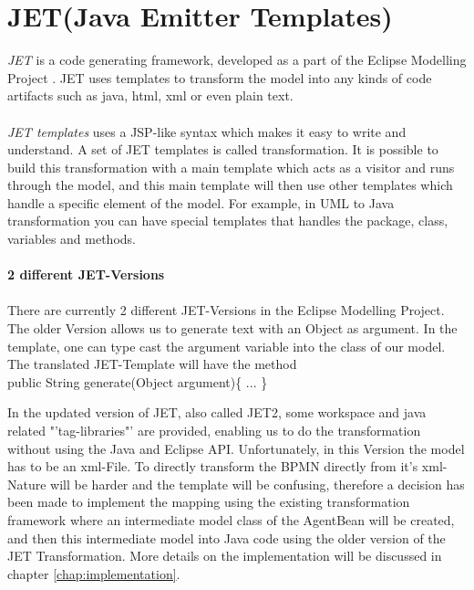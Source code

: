 \section{JET(Java Emitter Templates)}
\textit{JET}\cite{13} is a code generating framework, developed as a part of the Eclipse Modelling Project \cite{14}. JET uses templates to transform the model into any kinds of code artifacts such as java, html, xml or even plain text. \\\\
\textit{JET templates} uses a JSP-like syntax which makes it easy to write and understand. A set of JET templates is called transformation. It is possible to build this transformation with a main template which acts as a visitor and runs through the model, and this main template will then use other templates which handle a specific element of the model. For example, in UML to Java transformation you can have special templates that handles the package, class, variables and methods.\\\\

\textbf{2 different JET-Versions}\\\\
There are currently 2 different JET-Versions in the Eclipse Modelling Project. The older Version allows us to generate text with an Object as argument. In the template, one can type cast the argument variable into the class of our model. \\
The translated JET-Template will have the method \\
public String generate(Object argument)\{
...
\}

In the updated version of JET, also called JET2, some workspace and java related "'tag-libraries"' are provided, enabling us to do the transformation without using the Java and Eclipse API. Unfortunately, in this Version the model has to be an xml-File.
To directly transform the BPMN directly from it's xml-Nature will be harder and the template will be confusing, therefore a decision has been made to implement the mapping using the existing transformation framework where an intermediate model class of the AgentBean will be created, and then this intermediate model into Java code using the older version of the JET Transformation.
More details on the implementation will be discussed in chapter \ref{chap:implementation}.